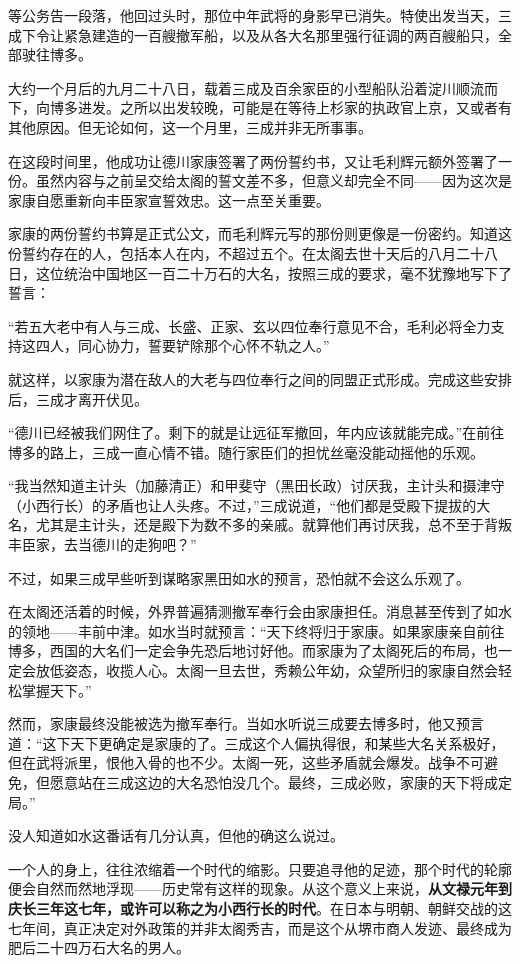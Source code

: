 \documentclass[
]{book}
\begin{document}
等公务告一段落，他回过头时，那位中年武将的身影早已消失。特使出发当天，三成下令让紧急建造的一百艘撤军船，以及从各大名那里强行征调的两百艘船只，全部驶往博多。

大约一个月后的九月二十八日，载着三成及百余家臣的小型船队沿着淀川顺流而下，向博多进发。之所以出发较晚，可能是在等待上杉家的执政官上京，又或者有其他原因。但无论如何，这一个月里，三成并非无所事事。

在这段时间里，他成功让德川家康签署了两份誓约书，又让毛利辉元额外签署了一份。虽然内容与之前呈交给太阁的誓文差不多，但意义却完全不同------因为这次是家康自愿重新向丰臣家宣誓效忠。这一点至关重要。

家康的两份誓约书算是正式公文，而毛利辉元写的那份则更像是一份密约。知道这份誓约存在的人，包括本人在内，不超过五个。在太阁去世十天后的八月二十八日，这位统治中国地区一百二十万石的大名，按照三成的要求，毫不犹豫地写下了誓言：

``若五大老中有人与三成、长盛、正家、玄以四位奉行意见不合，毛利必将全力支持这四人，同心协力，誓要铲除那个心怀不轨之人。''

就这样，以家康为潜在敌人的大老与四位奉行之间的同盟正式形成。完成这些安排后，三成才离开伏见。

``德川已经被我们网住了。剩下的就是让远征军撤回，年内应该就能完成。''在前往博多的路上，三成一直心情不错。随行家臣们的担忧丝毫没能动摇他的乐观。

``我当然知道主计头（加藤清正）和甲斐守（黑田长政）讨厌我，主计头和摄津守（小西行长）的矛盾也让人头疼。不过，''三成说道，``他们都是受殿下提拔的大名，尤其是主计头，还是殿下为数不多的亲戚。就算他们再讨厌我，总不至于背叛丰臣家，去当德川的走狗吧？''

不过，如果三成早些听到谋略家黑田如水的预言，恐怕就不会这么乐观了。

在太阁还活着的时候，外界普遍猜测撤军奉行会由家康担任。消息甚至传到了如水的领地------丰前中津。如水当时就预言：``天下终将归于家康。如果家康亲自前往博多，西国的大名们一定会争先恐后地讨好他。而家康为了太阁死后的布局，也一定会放低姿态，收揽人心。太阁一旦去世，秀赖公年幼，众望所归的家康自然会轻松掌握天下。''

然而，家康最终没能被选为撤军奉行。当如水听说三成要去博多时，他又预言道：``这下天下更确定是家康的了。三成这个人偏执得很，和某些大名关系极好，但在武将派里，恨他入骨的也不少。太阁一死，这些矛盾就会爆发。战争不可避免，但愿意站在三成这边的大名恐怕没几个。最终，三成必败，家康的天下将成定局。''

没人知道如水这番话有几分认真，但他的确这么说过。

一个人的身上，往往浓缩着一个时代的缩影。只要追寻他的足迹，那个时代的轮廓便会自然而然地浮现------历史常有这样的现象。从这个意义上来说，\textbf{从文禄元年到庆长三年这七年，或许可以称之为小西行长的时代}。在日本与明朝、朝鲜交战的这七年间，真正决定对外政策的并非太阁秀吉，而是这个从堺市商人发迹、最终成为肥后二十四万石大名的男人。
\end{document}
